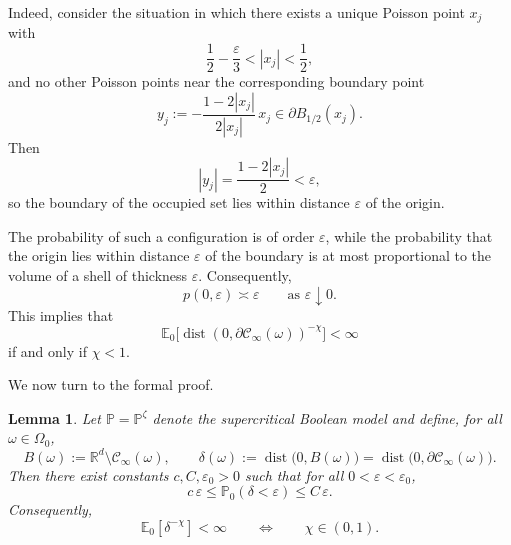 \documentclass[11pt]{article}
\newcommand{\dist}{\mathop{\mathrm{dist}}}
\newcommand{\eps}{\varepsilon}
\newcommand{\E}{\mathbb E}
\renewcommand{\P}{\mathbb P}
\newtheorem{lemma}[theorem]{Lemma}
\theoremstyle{rem}
\begin{document}
Indeed, consider the situation in which there exists a unique Poisson point
$x_j$ with
\[
\frac12-\frac{\eps}{3}<|x_j|<\frac12,
\]
and no other Poisson points near the corresponding boundary point
\[
y_j:=
-\frac{1-2|x_j|}{2|x_j|}\,x_j
\in \partial B_{1/2}(x_j).
\]
Then
\[
|y_j|
=
\frac{1-2|x_j|}{2}
<
\eps,
\]
so the boundary of the occupied set lies within distance $\eps$ of the origin.

The probability of such a configuration is of order $\eps$, while the probability that the origin lies within distance $\eps$ of the boundary is at most proportional to the volume of a shell of thickness $\eps$. Consequently,
\[
p(0,\eps)\asymp \eps
\qquad
\text{as }\eps\downarrow0.
\]
This implies that
\[
\E_0\bigl[\dist(0,\partial\mathcal C_\infty(\omega))^{-\chi}\bigr]
<\infty
\]
if and only if $\chi<1$.

We now turn to the formal proof.

\begin{lemma}
Let $\P=\P^\zeta$ denote the supercritical Boolean model and define, for all $\omega\in\Omega_0$,
\[
B(\omega):=\mathbb R^d\setminus \mathcal C_\infty(\omega),
\qquad
\delta(\omega):=
\dist\bigl(0,B(\omega)\bigr)
=
\dist\bigl(0,\partial\mathcal C_\infty(\omega)\bigr).
\]
Then there exist constants $c,C,\varepsilon_0>0$ such that for all
$0<\varepsilon<\varepsilon_0$,
\[
c\,\varepsilon
\le
\P_0(\delta<\varepsilon)
\le
C\,\varepsilon.
\]
Consequently,
\[
\E_0[\delta^{-\chi}]<\infty
\qquad\Longleftrightarrow\qquad
\chi\in (0,1).
\]
\end{lemma}
\end{document}

